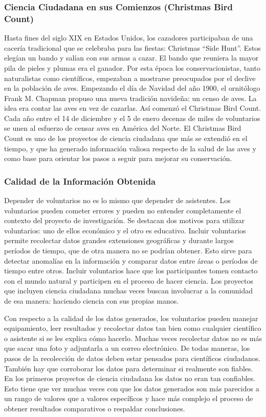 \subsubsection{Ciencia Ciudadana en sus Comienzos (Christmas Bird Count)}
	Hasta fines del siglo XIX en Estados Unidos, los cazadores participaban de una cacería tradicional que se celebraba para las fiestas: Christmas ``Side Hunt''. Estos elegían un bando y salían con sus armas a cazar. El bando que reuniera la mayor pila de pieles y plumas era el ganador. Por esta época los conservacionistas, tanto naturalistas como científicos, empezaban a mostrarse preocupados por el declive en la población de aves. Empezando el día de Navidad del año 1900, el ornitólogo Frank M. Chapman propuso una nueva tradición navideña: un censo de aves. La idea era contar las aves en vez de cazarlas. Así comenzó el Christmas Bird Count. Cada año entre el 14 de diciembre y el 5 de enero decenas de miles de voluntarios se unen al esfuerzo de censar aves en América del Norte. El Christmas Bird Count es uno de los proyectos de ciencia ciudadana que más se extendió en el tiempo, y que ha generado información valiosa respecto de la salud de las aves y como base para orientar los pasos a seguir para mejorar su conservación. \cite{CBC}
	
\subsubsection{Calidad de la Información Obtenida}	

Depender de voluntarios no es lo mismo que depender de asistentes. Los voluntarios pueden cometer errores y pueden no entender completamente el contexto del proyecto de investigación. Se destacan dos motivos para utilizar voluntarios: uno de ellos económico y el otro es educativo. Incluir voluntarios permite recolectar datos grandes extensiones geográficas y durante largos períodos de tiempo, que de otra manera no se podrían obtener. Esto sirve para detectar anomalías en la información y comparar datos entre áreas o períodos de tiempo entre otros. Incluir voluntarios hace que los participantes tomen contacto con el mundo natural y participen en el proceso de hacer ciencia. Los proyectos que incluyen ciencia ciudadana muchas veces buscan involucrar a la comunidad de esa manera: haciendo ciencia con sus propias manos.

Con respecto a la calidad de los datos generados, los voluntarios pueden manejar equipamiento, leer resultados y recolectar datos tan bien como cualquier científico o asistente si se les explica cómo hacerlo. Muchas veces recolectar datos no es más que sacar una foto y adjuntarla a un correo electrónico. De todas maneras, los pasos de la recolección de datos deben estar pensados para científicos ciudadanos. También hay que corroborar los datos para determinar si realmente son fiables. En los primeros proyectos de ciencia ciudadana los datos no eran tan confiables. Esto tiene que ver muchas veces con que los datos generados son más parecidos a un rango de valores que a valores específicos y hace más complejo el proceso de obtener resultados comparativos o respaldar conclusiones. 
	

